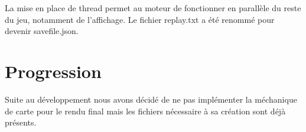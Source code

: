 La mise en place de thread permet au moteur de fonctionner en parallèle du reste du jeu, notamment de l'affichage.
Le fichier replay.txt a été renommé pour devenir savefile.json.



\section{Progression}

Suite au développement nous avons décidé de ne pas implémenter la méchanique de carte pour le rendu final mais les fichiers nécessaire à sa création sont déjà présents.








